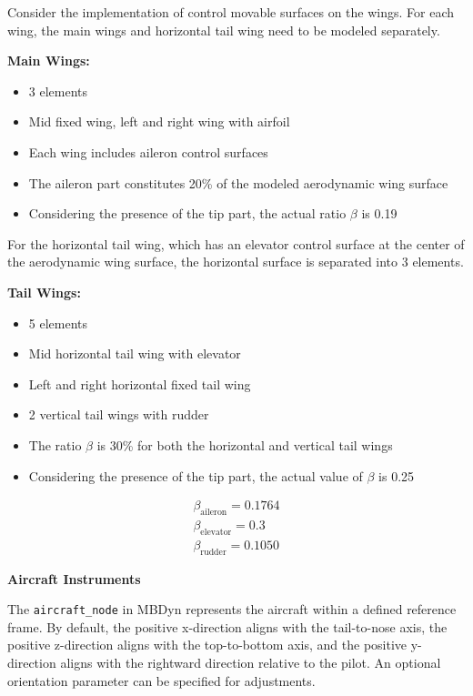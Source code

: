 Consider the implementation of control movable surfaces on the wings. For each wing, the main wings and horizontal tail wing need to be modeled separately.

\textbf{Main Wings:}
\begin{itemize}
    \item 3 elements
    \item Mid fixed wing, left and right wing with airfoil
    \item Each wing includes aileron control surfaces
    \item The aileron part constitutes 20\% of the modeled aerodynamic wing surface
    \item Considering the presence of the tip part, the actual ratio $\beta$ is 0.19
\end{itemize}

For the horizontal tail wing, which has an elevator control surface at the center of the aerodynamic wing surface, the horizontal surface is separated into 3 elements.

\textbf{Tail Wings:}
\begin{itemize}
    \item 5 elements
    \item Mid horizontal tail wing with elevator
    \item Left and right horizontal fixed tail wing
    \item 2 vertical tail wings with rudder
    \item The ratio $\beta$ is 30\% for both the horizontal and vertical tail wings
    \item Considering the presence of the tip part, the actual value of $\beta$ is 0.25
\end{itemize}

\begin{align}
    \beta_{\text{aileron}} = 0.1764 \\
    \beta_{\text{elevator}} = 0.3 \\
    \beta_{\text{rudder}} = 0.1050
\end{align}

\textbf{Aircraft Instruments}

The \texttt{aircraft\_node} in MBDyn represents the aircraft within a defined reference frame. By default, the positive x-direction aligns with the tail-to-nose axis, the positive z-direction aligns with the top-to-bottom axis, and the positive y-direction aligns with the rightward direction relative to the pilot. An optional orientation parameter can be specified for adjustments.

